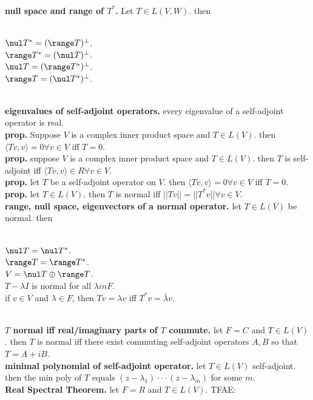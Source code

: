 	\\ \textbf{null space and range of $T^*$. } Let $T \in L(V,W)$. then 
	\begin{enumerate}
		\\ $\nul T^* = (\range T)^\perp$. 
		\\ $\range T^* = (\nul T)^\perp$. 
		\\ $\nul T = (\range T^*)^\perp$. 
		\\ $\range T = (\nul T^*)^\perp$. 
	\end{enumerate}
	\\ \textbf{eigenvalues of self-adjoint operators. } every eigenvalue of a self-adjoint operator is real. 
	\\ \textbf{prop. } Suppose $V$ is a complex inner product space and $T \in L(V)$. then $\langle Tv,v \rangle = 0 \forall v \in V$ iff $T=0$. 
	\\ \textbf{prop. } suppose $V$ is a complex inner product space and $T \in L(V)$. then $T$ is self-adjoint iff $\langle Tv,v \rangle \in R \forall v \in V$. 
	\\ \textbf{prop. } let $T$ be a self-adjoint operator on $V$. then $\langle Tv,v \rangle = 0 \forall v \in V$ iff $T=0$. 
	\\ \textbf{prop. } let $T \in L(V)$. then $T$ is normal iff $||Tv|| = ||T^*v|| \forall v \in V$. 
	\\ \textbf{range, null space, eigenvectors of a normal operator. } let $T \in L(V)$ be normal. then
	\begin{enumerate}
		\\ $\nul T = \nul T^*$. 
		\\ $\range T = \range T^*$. 
		\\ $V = \nul T \oplus \range T$. 
		\\ $T-\lambda I$ is normal for all $\lambda in F$. 
		\\ if $v \in V$ and $\lambda \in F$, then $Tv=\lambda v$ iff $T^*v = \overline{\lambda}v$. 
	\end{enumerate}
	\\ \textbf{$T$ normal iff real/imaginary parts of $T$ commute. } let $F=C$ and $T \in L(V)$. then $T$ is normal iff there exist commuting self-adjoint operators $A,B$ so that $T=A+iB$. 
	\\ \textbf{minimal polynomial of self-adjoint operator. } let $T \in L(V)$ self-adjoint. then the min poly of $T$ equals $(z-\lambda_1) \cdot \cdot \cdot (z-\lambda_m)$ for some $m$. 
	\\ \textbf{Real Spectral Theorem. } let $F=R$ and $T \in L(V)$. TFAE: 
